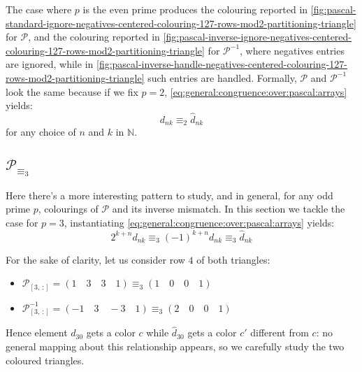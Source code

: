 The case where $p$ is the even prime produces the colouring reported in
\autoref{fig:pascal-standard-ignore-negatives-centered-colouring-127-rows-mod2-partitioning-triangle} for $\mathcal{P}$,
and the colouring reported in
\autoref{fig:pascal-inverse-ignore-negatives-centered-colouring-127-rows-mod2-partitioning-triangle} for $\mathcal{P}^{-1}$,
where negatives entries are ignored, while in 
\autoref{fig:pascal-inverse-handle-negatives-centered-colouring-127-rows-mod2-partitioning-triangle} such entries are handled.
Formally, $\mathcal{P}$ and $\mathcal{P}^{-1}$ look the same because if we fix $p=2$, 
\autoref{eq:general:congruence:over:pascal:arrays} yields:
\begin{displaymath} 
    d_{nk} \equiv_{2} \hat{d}_{nk} 
\end{displaymath} 
for any choice of $n$ and $k$ in $\mathbb{N}$.






\subsection{$\mathcal{P}_{\equiv_{3}}$}

Here there's a more interesting pattern to study, and in general,
for any odd prime $p$, colourings of $\mathcal{P}$ and its inverse 
mismatch. In this section we tackle the case for $p=3$,
instantiating \autoref{eq:general:congruence:over:pascal:arrays} yields:
\begin{displaymath}
  2^{k+n}d_{nk}\equiv_{3}(-1)^{k+n}d_{nk} \equiv_{3} \hat{d}_{nk}
\end{displaymath}

For the sake of clarity, let us consider row $4$ of both triangles:
\begin{itemize}
\item $\mathcal{P}_{[3,\,:]} = (1 \quad 3 \quad 3 \quad 1) \equiv_{3}(1 \quad 0 \quad 0 \quad 1)$
\item $\mathcal{P}^{-1}_{[3,\,:]} = (-1 \quad 3 \quad -3 \quad 1) \equiv_{3}(2 \quad 0 \quad 0 \quad 1)$
\end{itemize}
Hence element $d_{30}$ gets a color $c$ while $\hat{d}_{30}$ gets
a color $c'$ different from $c$: no general mapping about this relationship appears, so we
carefully study the two coloured triangles. 

